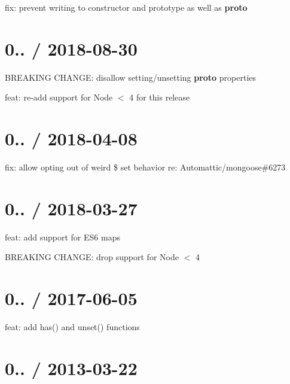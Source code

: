 
\begin{DoxyItemize}
\item fix\+: prevent writing to constructor and prototype as well as {\bfseries proto}
\end{DoxyItemize}

\section*{0.. / 2018-\/08-\/30 }


\begin{DoxyItemize}
\item B\+R\+E\+A\+K\+I\+NG C\+H\+A\+N\+GE\+: disallow setting/unsetting {\bfseries proto} properties
\item feat\+: re-\/add support for Node $<$ 4 for this release
\end{DoxyItemize}

\section*{0.. / 2018-\/04-\/08 }


\begin{DoxyItemize}
\item fix\+: allow opting out of weird {\ttfamily \$} set behavior re\+: Automattic/mongoose\#6273
\end{DoxyItemize}

\section*{0.. / 2018-\/03-\/27 }


\begin{DoxyItemize}
\item feat\+: add support for E\+S6 maps
\item B\+R\+E\+A\+K\+I\+NG C\+H\+A\+N\+GE\+: drop support for Node $<$ 4
\end{DoxyItemize}

\section*{0.. / 2017-\/06-\/05 }


\begin{DoxyItemize}
\item feat\+: add has() and unset() functions
\end{DoxyItemize}

\section*{0.. / 2013-\/03-\/22 }


